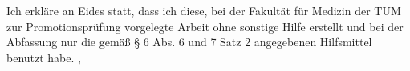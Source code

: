 \thispagestyle{empty}
\vspace*{0.8\textheight}
\noindent
Ich erkläre an Eides statt, dass ich diese, bei der Fakultät für Medizin der TUM zur Promotionsprüfung vorgelegte Arbeit ohne sonstige Hilfe erstellt und bei der Abfassung nur die gemäß § 6 Abs. 6 und 7 Satz 2 angegebenen Hilfsmittel benutzt habe.
\vspace{15mm}
\noindent
\getSubmissionLocation{}, \getSubmissionDate{} \hspace{5cm} \getAuthor{}

\cleardoublepage{}
